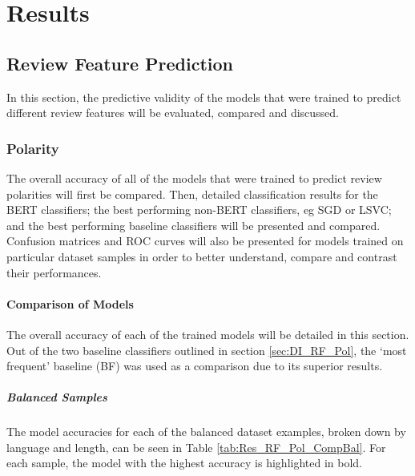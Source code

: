 \chapter{Results} \label{sec:Res}

\section{Review Feature Prediction} \label{sec:Res_RF}

In this section, the predictive validity of the models that were trained to predict different review features will be evaluated, compared and discussed.

\subsection{Polarity} \label{sec:Res_RF_Pol}

The overall accuracy of all of the models that were trained to predict review polarities will first be compared. Then, detailed classification results for the BERT classifiers; the best performing non-BERT classifiers, eg SGD or LSVC; and the best performing baseline classifiers will be presented and compared. Confusion matrices and ROC curves will also be presented for models trained on particular dataset samples in order to better understand, compare and contrast their performances.

\subsubsection{Comparison of Models}

The overall accuracy of each of the trained models will be detailed in this section. Out of the two baseline classifiers outlined in section \ref{sec:DI_RF_Pol}, the `most frequent' baseline (BF) was used as a comparison due to its superior results.

\paragraph{Balanced Samples}

The model accuracies for each of the balanced dataset examples, broken down by language and length, can be seen in Table \ref{tab:Res_RF_Pol_CompBal}. For each sample, the model with the highest accuracy is highlighted in bold.

